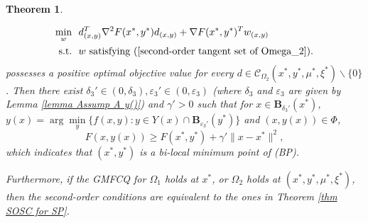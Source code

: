 \documentclass[11pt]{article}
\newtheorem{theorem}{Theorem}[section]
\theoremstyle{definition}
\theoremstyle{remark}
\numberwithin{equation}{section}
\begin{document}
\begin{theorem}
\begin{itemize}
\begin{align}
    \min_{w}~~&d_{(x,y)}^T\nabla^2 F(x^*, y^*) d_{(x,y)}+\nabla F(x^*, y^*)^{T} w_{(x,y)}\notag \\
     {\rm s.t.}~~&w ~{\rm satisfying}~ (\ref{second-order tangent set of Omega_2}).\notag
   \end{align}
possesses a positive optimal objective value for every $d\in \mathcal{C}_{\Omega_2}(x^*,y^*,\mu^*,\xi^*)\backslash \{0\}$. Then there exist  $\delta_3' \in(0, \delta_3), \varepsilon_3' \in(0, \varepsilon_3)$ (where $\delta_3$ and
  $\varepsilon_3$ are given by Lemma \ref{lemma Assump A y()})
   and $\gamma'>0$ such that for $x \in
  \boldsymbol{B}_{\delta_3'}(x^*)$, $y(x) =\arg\min\limits_y\{f(x,y):y\in Y(x)\cap \boldsymbol{B}_{\varepsilon_3'}(y^*) \} $
  and $(x,y(x))\in \Phi$,
\begin{equation}\label{equ-growth}
  F(x,y(x))\ge F(x^*,y^*)+\gamma' \|x-x^*\|^2,
\end{equation}
which indicates that $\left(x^*, y^*\right)$ is a bi-local minimum point of (BP).
  \end{itemize}

Furthermore, if
the GMFCQ for $\Omega_1$ holds at $x^*$, or $\Omega_2$ holds at $(x^*,y^*,\mu^*,\xi^*)$, then the second-order conditions are equivalent to the ones in Theorem \ref{thm SOSC for SP}.
\end{theorem}
\end{document}
